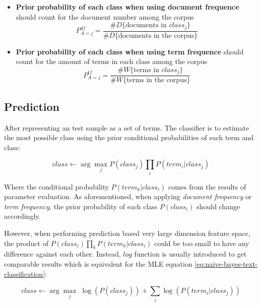 \documentclass{article}
\begin{document}
\begin{itemize}
	\item \textbf{Prior probability of each class when using document frequence} should count for the document number among the corpus
	\begin{equation}\label{eq:prior_df}
		P_{A=j}^{df}=\frac{\#D\{\text{documents in $class_j$}\}}{\#D\{\text{documents in the corpus}\}}
	\end{equation}
	\item \textbf{Prior probability of each class when using term frequence} should count for the amount of terms in each class among the corpus
	\begin{equation}\label{eq:prior_tf}
		P_{A=j}^{tf}=\frac{\#W\{\text{terms in $class_j$}\}}{\#W\{\text{terms in the corpus}\}}
	\end{equation}
\end{itemize}

\subsection{Prediction}

After representing an test sample as a set of terms. The classifier is to estimate the most possible class using the prior conditional probabilities of each term and class:

\begin{equation} \label{eq:naive-bayes-text-classification}
	class \leftarrow \arg\max_{j} {P(class_j)\prod_{i}{P(term_i|class_j)}}
\end{equation}

Where the conditional probability $P(term_k|class_i)$ comes from the results of parameter evaluation. As aforementioned, when applying \textit{document frequency} or \textit{term frequency}, the prior probability of each class $P(class_i)$ should change accordingly.

However, when performing prediction based very large dimension feature space, the product of $P(class_i)\prod_{k}{P(term_k|class_i)}$ could be too small to have any difference against each other. Instead, $log$ function is usually introduced to get comparable results which is equivalent for the MLE equation \ref{eq:naive-bayes-text-classification}:

\begin{equation} \label{eq:naive-bayes-text-classification-using-log}
	class \leftarrow \arg\max_{j} {\; \log(P(class_j)) + \sum_{i}{\log{(P(term_i|class_j))}}}
\end{equation}
\end{document}
